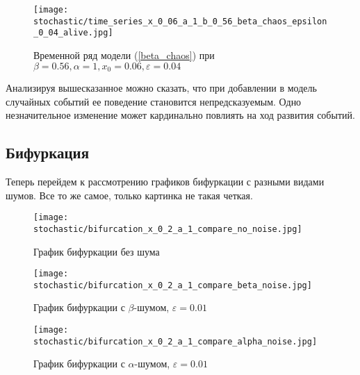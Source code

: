         \begin{figure}
            \centering
            \texttt{[image: stochastic/time\_series\_x\_0\_06\_a\_1\_b\_0\_56\_beta\_chaos\_epsilon\_0\_04\_alive.jpg]}
        
            \captionsetup{justification=centering}
            \caption{Временной ряд модели (\ref{beta_chaos}) при \(\beta = 0.56, \alpha = 1, x_0 = 0.06, \varepsilon = 0.04\)}
            \label{time_series_x_0_06_a_1_b_0_56_beta_chaos_epsilon_0_04_alive}
        \end{figure}

        Анализируя вышесказанное можно сказать, что при добавлении в модель случайных событий ее поведение становится непредсказуемым. Одно незначительное изменение может кардинально повлиять на ход развития событий. 


    \subsection{Бифуркация}

        Теперь перейдем к рассмотрению графиков бифуркации с разными видами шумов. Все то же самое, только картинка не такая четкая.

        \begin{figure}
            \centering
            \texttt{[image: stochastic/bifurcation\_x\_0\_2\_a\_1\_compare\_no\_noise.jpg]}
        
            \captionsetup{justification=centering}
            \caption{График бифуркации без шума}
            \label{bifurcation_x_0_2_a_1_compare_no_noise}
        \end{figure}

        \begin{figure}
            \centering
            \texttt{[image: stochastic/bifurcation\_x\_0\_2\_a\_1\_compare\_beta\_noise.jpg]}
        
            \captionsetup{justification=centering}
            \caption{График бифуркации с \(\beta\)-шумом, \(\varepsilon = 0.01\)}
            \label{bifurcation_x_0_2_a_1_compare_beta_noise}
        \end{figure}

        \begin{figure}
            \centering
            \texttt{[image: stochastic/bifurcation\_x\_0\_2\_a\_1\_compare\_alpha\_noise.jpg]}
        
            \captionsetup{justification=centering}
            \caption{График бифуркации с \(\alpha\)-шумом, \(\varepsilon = 0.01\)}
            \label{bifurcation_x_0_2_a_1_compare_alpha_noise}
        \end{figure}

